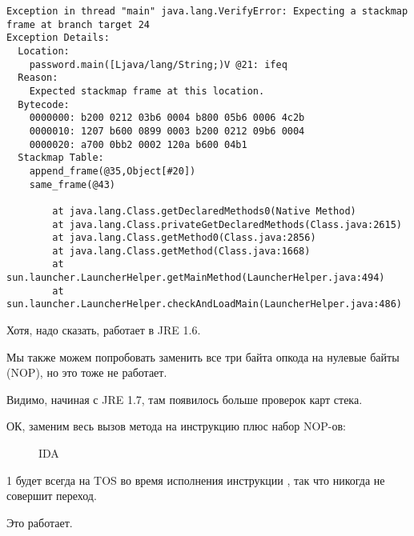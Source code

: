 \begin{lstlisting}
Exception in thread "main" java.lang.VerifyError: Expecting a stackmap frame at branch target 24
Exception Details:
  Location:
    password.main([Ljava/lang/String;)V @21: ifeq
  Reason:
    Expected stackmap frame at this location.
  Bytecode:
    0000000: b200 0212 03b6 0004 b800 05b6 0006 4c2b
    0000010: 1207 b600 0899 0003 b200 0212 09b6 0004
    0000020: a700 0bb2 0002 120a b600 04b1
  Stackmap Table:
    append_frame(@35,Object[#20])
    same_frame(@43)

        at java.lang.Class.getDeclaredMethods0(Native Method)
        at java.lang.Class.privateGetDeclaredMethods(Class.java:2615)
        at java.lang.Class.getMethod0(Class.java:2856)
        at java.lang.Class.getMethod(Class.java:1668)
        at sun.launcher.LauncherHelper.getMainMethod(LauncherHelper.java:494)
        at sun.launcher.LauncherHelper.checkAndLoadMain(LauncherHelper.java:486)
\end{lstlisting}

Хотя, надо сказать, работает в JRE 1.6.


Мы также можем попробовать заменить все три байта опкода  на нулевые байты (\ac{NOP}), 
но это тоже не работает.

Видимо, начиная с JRE 1.7, там появилось больше проверок карт стека.


ОК, заменим весь вызов метода  на инструкцию  плюс набор 
\ac{NOP}-ов:

\begin{figure}[H]
\centering
{}
\caption{IDA}
\end{figure}


1 будет всегда на \ac{TOS} во время исполнения инструкции , 
так что  никогда не совершит переход.

Это работает.
